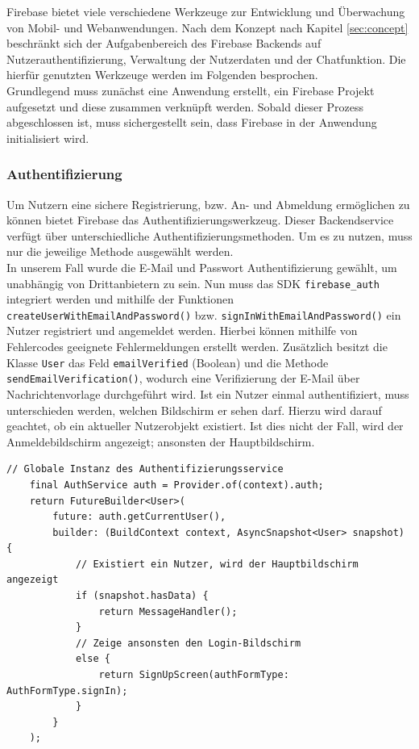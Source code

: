 Firebase bietet viele verschiedene Werkzeuge zur Entwicklung und Überwachung von Mobil- und Webanwendungen.
Nach dem Konzept nach Kapitel \ref{sec:concept} beschränkt sich der Aufgabenbereich des Firebase Backends auf Nutzerauthentifizierung, Verwaltung der Nutzerdaten und der Chatfunktion.
Die hierfür genutzten Werkzeuge werden im Folgenden besprochen.\\
Grundlegend muss zunächst eine Anwendung erstellt, ein Firebase Projekt aufgesetzt und diese zusammen verknüpft werden.
Sobald dieser Prozess abgeschlossen ist, muss sichergestellt sein, dass Firebase in der Anwendung initialisiert wird.

\subsubsection{Authentifizierung}
Um Nutzern eine sichere Registrierung, bzw. An- und Abmeldung ermöglichen zu können bietet Firebase das Authentifizierungswerkzeug. 
Dieser Backendservice verfügt über unterschiedliche Authentifizierungsmethoden.
Um es zu nutzen, muss nur die jeweilige Methode ausgewählt werden. \\

\noindent
In unserem Fall wurde die E-Mail und Passwort Authentifizierung gewählt, um unabhängig von Drittanbietern zu sein.
Nun muss das SDK \texttt{firebase\_auth} integriert werden und mithilfe der Funktionen \texttt{createUserWithEmailAndPassword()} bzw. \texttt{signInWithEmailAndPassword()} ein Nutzer registriert und angemeldet werden.
Hierbei können mithilfe von Fehlercodes geeignete Fehlermeldungen erstellt werden. 
Zusätzlich besitzt die Klasse \texttt{User} das Feld \texttt{emailVerified} (Boolean) und die Methode \texttt{sendEmailVerification()}, wodurch eine Verifizierung der E-Mail über Nachrichtenvorlage durchgeführt wird.
Ist ein Nutzer einmal authentifiziert, muss unterschieden werden, welchen Bildschirm er sehen darf.
Hierzu wird darauf geachtet, ob ein aktueller Nutzerobjekt existiert.
Ist dies nicht der Fall, wird der Anmeldebildschirm angezeigt; ansonsten der Hauptbildschirm.
\medspace
\begin{lstlisting}[caption= Anzeige abhängig ob ein aktueller Nutzer existiert]
	// Globale Instanz des Authentifizierungsservice
	final AuthService auth = Provider.of(context).auth;
	return FutureBuilder<User>(
		future: auth.getCurrentUser(),
		builder: (BuildContext context, AsyncSnapshot<User> snapshot) {
			// Existiert ein Nutzer, wird der Hauptbildschirm angezeigt
			if (snapshot.hasData) {
				return MessageHandler();
			} 
			// Zeige ansonsten den Login-Bildschirm
			else {
				return SignUpScreen(authFormType: AuthFormType.signIn);
			}
		}
	);
\end{lstlisting}
\medspace

